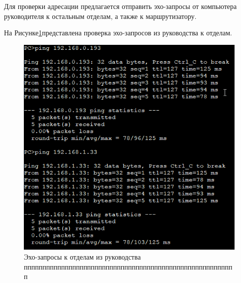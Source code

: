 \documentclass[14pt, a4paper]{extarticle}
\numberwithin{equation}{section}
\begin{document}
Для проверки адресации предлагается отправить эхо-запросы от компьютера руководителя к остальным отделам, а также к маршрутизатору.

На Рисунке\;\ref{fig:first}представлена проверка эхо-запросов из руководства к отделам.
\begin{figure}[H]
\centering
\includegraphics[scale=0.7]{misc/first}
\caption{Эхо-запросы к отделам из руководства ппппппппппппппппппппппппппппппппппппппппппппппппппппппппп\label{fig:first}}
\end{figure}
\end{document}
